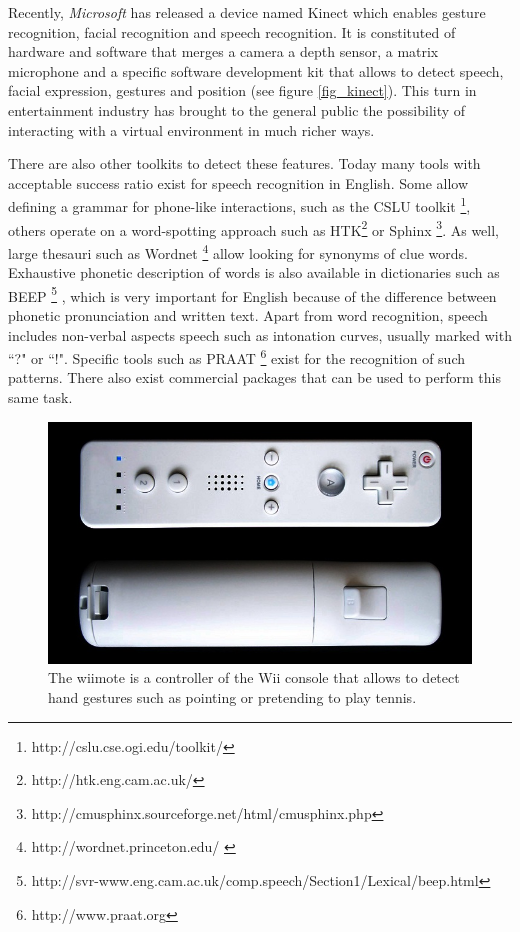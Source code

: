 \documentclass[
		twoside,openright,titlepage,numbers=noenddot,manychapters,
		headinclude,%
                footinclude=false,cleardoublepage=empty,
                BCOR=5mm,
		fontsize=11pt, %
                 enabledeprecatedfontcommands]{scrreprt}
\begin{document}
Recently, \emph{Microsoft} has released a device named Kinect which enables gesture recognition, facial recognition and speech recognition. It is constituted of  hardware and software that merges a camera a depth sensor, a matrix microphone and a specific software development kit that allows to detect speech, facial expression, gestures and position (see figure \ref{fig_kinect}).
This turn in entertainment industry has brought to the general public the possibility of interacting with a virtual environment in much richer ways.



There are also other toolkits to detect these features. Today many tools with acceptable success ratio exist for speech recognition in English. Some allow defining a grammar for phone-like interactions, such as the CSLU toolkit \footnote{ {http://cslu.cse.ogi.edu/toolkit/} }, others operate on a word-spotting approach such as HTK\footnote{{http://htk.eng.cam.ac.uk/}} or Sphinx \footnote{{http://cmusphinx.sourceforge.net/html/cmusphinx.php}}.
As well, large thesauri such as Wordnet \footnote{ {http://wordnet.princeton.edu/ } } allow looking for synonyms of clue words. Exhaustive phonetic description of words is also available in dictionaries such as BEEP \footnote{{http://svr-www.eng.cam.ac.uk/comp.speech/Section1/Lexical/beep.html}} , which is very important for English because of the difference between phonetic pronunciation and written text. Apart from word recognition, speech includes non-verbal aspects speech such as intonation curves, usually marked with ``?" or ``!". Specific tools such as PRAAT \footnote{{http://www.praat.org} }  exist for the recognition of such patterns. There also exist commercial packages that can be used to perform this same task.

\begin{figure}[]
\begin{center}
\includegraphics[width=12cm]{figures/wiimote.jpg}
\caption{ The wiimote is a controller of the Wii console that allows to detect hand gestures such as pointing or pretending to  play tennis. %
}
\label{fig_wiimote}
\end{center}
\end{figure}
\end{document}
